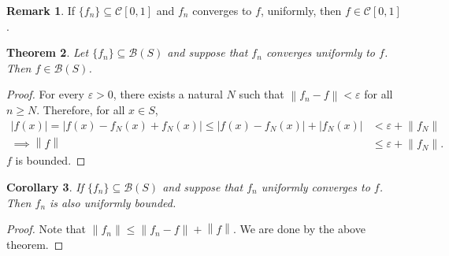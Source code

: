 \documentclass[15pt,a4paper]{book}
\newtheorem{theorem}{Theorem}[chapter]
\newtheorem{corollary}[theorem]{Corollary}
\theoremstyle{definition}
\newtheorem{remark}[theorem]{Remark}
\newcommand{\abs}[1]{\left| #1 \right|} %
\newcommand{\cB}{\mathcal{B}}
\newcommand{\cC}{\mathcal{C}}
\newcommand{\norm}[1]{\left\lVert#1\right\rVert}
\begin{document}
\begin{remark}
    If $\{f_{n}\} \subseteq \cC[0,1]$ and $f_{n}$ converges to $f$, uniformly, then $f \in \cC[0,1]$.
\end{remark}

\begin{theorem}
    Let $\{f_{n}\} \subseteq \cB(S)$ and suppose that $f_{n}$ converges uniformly to $f$. Then $f \in \cB(S)$.
\end{theorem}
\begin{proof}
    For every $\varepsilon > 0$, there exists a natural $N$ such that $\norm{f_{n}-f} < \varepsilon$ for all $n \geq N$. Therefore, for all $x \in S$,
    \begin{align}
        \abs{f(x)} = \abs{f(x) - f_{N}(x) + f_{N}(x)} \leq \abs{f(x)-f_{N}(x)} + \abs{f_{N}(x)} &< \varepsilon + \norm{f_{N}} \\
        \implies \norm{f} &\leq \varepsilon + \norm{f_{N}}.
    \end{align}
    $f$ is bounded.
\end{proof}

\begin{corollary}
    If $\{f_{n}\} \subseteq \cB(S)$ and suppose that $f_{n}$ uniformly converges to $f$. Then $f_{n}$ is also uniformly bounded.
\end{corollary}
\begin{proof}
    Note that $\norm{f_{n}} \leq \norm{f_{n}-f} + \norm{f}$. We are done by the above theorem.
\end{proof}
\end{document}

